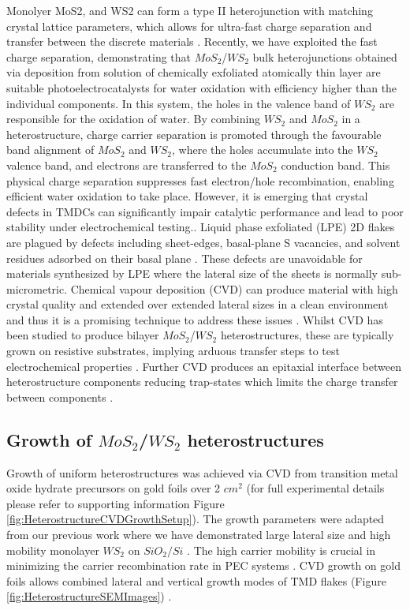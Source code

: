 Monolyer MoS2, and WS2 can form a type II heterojunction with matching crystal lattice parameters, which allows for ultra-fast charge separation and transfer between the discrete materials \cite{Chen2016}\cite{Wang2013}. Recently, we have exploited the fast charge separation, demonstrating that $MoS_2$/$WS_2$ bulk heterojunctions obtained via deposition from solution of chemically exfoliated atomically thin layer  are suitable photoelectrocatalysts for water oxidation \cite{Pesci2017} with efficiency higher than the individual components. In this system, the holes in the valence band of $WS_2$ are responsible for the oxidation of water. By combining $WS_2$ and $MoS_2$ in a heterostructure, charge carrier separation is promoted through the favourable band alignment of $MoS_2$ and $WS_2$, where the holes accumulate into the $WS_2$ valence band, and electrons are transferred to the $MoS_2$ conduction band. This physical charge separation suppresses fast electron/hole recombination, enabling efficient water oxidation to take place.
However, it is emerging that crystal defects in TMDCs can significantly impair catalytic performance and lead to poor stability under electrochemical testing.\cite{Yu2017}\cite{Voiry2016}\cite{Parzinger2015}\cite{Yu2017a}\cite{Raza2016}. Liquid phase exfoliated (LPE) 2D flakes are plagued by defects including sheet-edges, basal-plane S vacancies, and solvent residues adsorbed on their basal plane \cite{Yu2017}\cite{Yu2016}\cite{Sivula2016}. These defects are unavoidable for materials synthesized by LPE where the lateral size of the sheets is normally sub-micrometric. Chemical vapour deposition (CVD) can produce material with high crystal quality and extended over extended lateral sizes in a clean environment and thus it is a promising technique to address these issues \cite{Reale2017}. Whilst CVD has been studied to produce bilayer $MoS_2$/$WS_2$ heterostructures, these are typically grown on resistive substrates, implying arduous transfer steps to test electrochemical properties \cite{Chen2015}. Further CVD produces an epitaxial interface between heterostructure components reducing trap-states which limits the charge transfer between components \cite{Tan2018}.
 
\subsection{Growth of $MoS_2$/$WS_2$ heterostructures}

Growth of uniform heterostructures was achieved via CVD from transition metal oxide hydrate precursors on gold foils over 2 $cm^2$ (for full experimental details please refer to supporting information Figure \ref{fig:HeterostructureCVDGrowthSetup}). The growth parameters were adapted from our previous work where we have demonstrated large lateral size and high mobility monolayer $WS_2$ on $SiO_2/Si$ \cite{Reale2017}. The high carrier mobility is crucial in minimizing the carrier recombination rate in PEC systems \cite{Li2015a}. CVD growth on gold foils allows combined lateral and vertical growth modes of TMD flakes (Figure \ref{fig:HeterostructureSEMImages}) \cite{Shi2014}.

